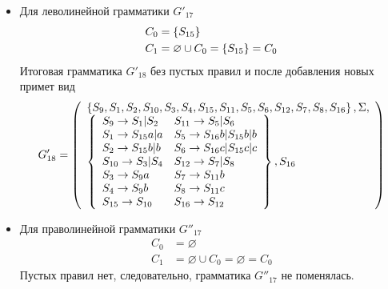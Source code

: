 \begin{itemize}
	\item Для леволинейной грамматики \(G'_{17}\)
	      \begin{align*}
		      C_{0} & = \left\{S_{15}\right\}                                  \\
		      C_{1} & = \varnothing \cup C_{0} = \left\{S_{15}\right\} = C_{0}
	      \end{align*}
	      Итоговая грамматика \(G'_{18}\) без пустых правил и после добавления новых примет вид
	      \begin{align*}
		      G'_{18} = \left( \begin{array}{l} \left\{S_9, S_1, S_2, S_{10}, S_3, S_4, S_{15}, S_{11}, S_5, S_6, S_{12}, S_7, S_8, S_{16}\right\}, \Sigma,\\\left\{\begin{array}{ll} 
		      S_9 \to S_1|S_2    & S_{11} \to S_5|S_6        \\
		      S_1 \to S_{15}a|a  & S_5 \to S_{16}b|S_{15}b|b \\
		      S_2 \to S_{15}b|b  & S_6 \to S_{16}c|S_{15}c|c \\
		      S_{10} \to S_3|S_4 & S_{12} \to S_7|S_8        \\
		      S_3 \to S_9a       & S_7 \to S_{11}b           \\
		      S_4 \to S_9b       & S_8 \to S_{11}c           \\
		      S_{15} \to S_{10}  & S_{16} \to S_{12}         \\
		       \end{array}\right\}, S_{16} \end{array} \right)                                      \\
	      \end{align*}
	\item Для праволинейной грамматики \(G''_{17}\)
	      \begin{align*}
		      C_{0} & = \varnothing                                  \\
		      C_{1} & = \varnothing \cup C_{0} = \varnothing = C_{0}
	      \end{align*}
	      Пустых правил нет, следовательно, грамматика \(G''_{17}\) не поменялась.
\end{itemize}
